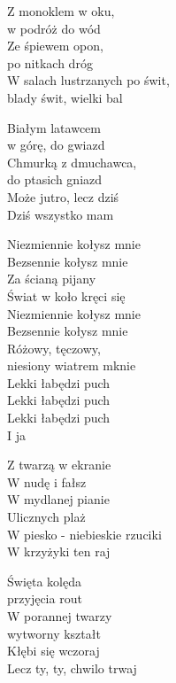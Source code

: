 
\begin{text}
    Z monoklem w oku,\\
    w podróż do wód\\
    Ze śpiewem opon,\\
    po nitkach dróg\\
    W salach lustrzanych po świt,\\
    blady świt, wielki bal

    Białym latawcem\\
    w górę, do gwiazd\\
    Chmurką z dmuchawca,\\
    do ptasich gniazd\\
    Może jutro, lecz dziś\\
    Dziś wszystko mam

    \vin Niezmiennie kołysz mnie\\
    \vin Bezsennie kołysz mnie\\
    \vin Za ścianą pijany\\
    \vin Świat w koło kręci się\\
    \vin Niezmiennie kołysz mnie\\
    \vin Bezsennie kołysz mnie\\
    \vin Różowy, tęczowy,\\
    \vin niesiony wiatrem mknie\\
    \vin Lekki łabędzi puch\\
    \vin Lekki łabędzi puch\\
    \vin Lekki łabędzi puch\\
    \vin I ja

    Z twarzą w ekranie\\
    W nudę i fałsz\\
    W mydlanej pianie\\
    Ulicznych plaż\\
    W piesko - niebieskie rzuciki\\
    W krzyżyki ten raj

    Święta kolęda\\
    przyjęcia rout\\
    W porannej twarzy\\
    wytworny kształt\\
    Kłębi się wczoraj\\
    Lecz ty, ty, chwilo trwaj
\end{text}
